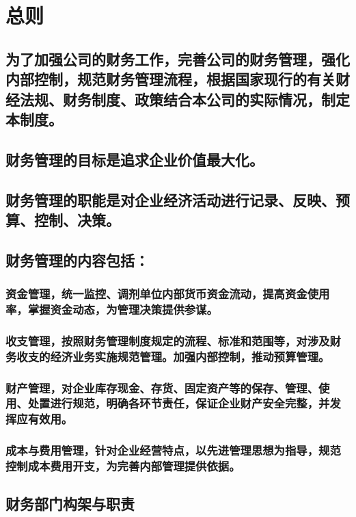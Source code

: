 \documentclass{ctexart}
\author{六盘水豆荚信息技术服务有限公司}
\date{}
\title{}
\begin{document}
\tableofcontents


\section{总则}
\label{sec-1}
\subsection{为了加强公司的财务工作，完善公司的财务管理，强化内部控制，规范财务管理流程，根据国家现行的有关财经法规、财务制度、政策结合本公司的实际情况，制定本制度。}
\label{sec-1-1}
\subsection{财务管理的目标是追求企业价值最大化。}
\label{sec-1-2}
\subsection{财务管理的职能是对企业经济活动进行记录、反映、预算、控制、决策。}
\label{sec-1-3}
\subsection{财务管理的内容包括：}
\label{sec-1-4}
\subsubsection{资金管理，统一监控、调剂单位内部货币资金流动，提高资金使用率，掌握资金动态，为管理决策提供参谋。}
\label{sec-1-4-1}
\subsubsection{收支管理，按照财务管理制度规定的流程、标准和范围等，对涉及财务收支的经济业务实施规范管理。加强内部控制，推动预算管理。}
\label{sec-1-4-2}
\subsubsection{财产管理，对企业库存现金、存货、固定资产等的保存、管理、使用、处置进行规范，明确各环节责任，保证企业财产安全完整，并发挥应有效用。}
\label{sec-1-4-3}
\subsubsection{成本与费用管理，针对企业经营特点，以先进管理思想为指导，规范控制成本费用开支，为完善内部管理提供依据。}
\label{sec-1-4-4}
\subsection{财务部门构架与职责}
\label{sec-1-5}
\end{document}
